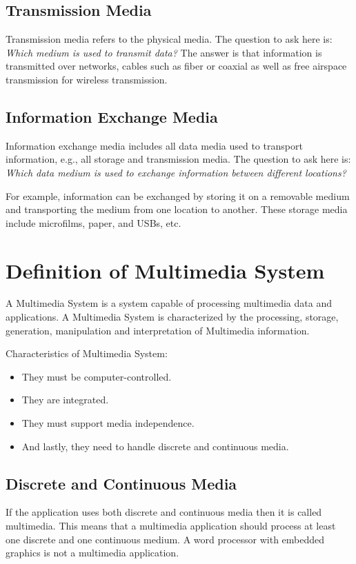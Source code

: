 \subsection{Transmission Media}
Transmission media refers to the physical media. The question to ask here is:
\emph{Which medium is used to transmit data?} The answer is that information is transmitted over networks, cables such as fiber or coaxial as well as free airspace transmission for wireless transmission.

\subsection{Information Exchange Media}
Information exchange media includes all data media used to transport information,
e.g., all storage and transmission media. The question to ask here is: \emph{Which data
medium is used to exchange information between different locations?}

For example, information can be exchanged by storing it on a removable medium
and transporting the medium from one location to another. These storage media include
microfilms, paper, and USBs, etc.

\section{Definition of Multimedia System}
A Multimedia System is a system capable of processing multimedia data and applications. A Multimedia System is characterized by the processing, storage, generation, manipulation and interpretation of Multimedia
information.


Characteristics of Multimedia System:

\begin{itemize}
	\item They must be computer-controlled.
	\item They are integrated.
	\item They must support media independence.
	\item And lastly, they need to handle discrete and continuous media.
\end{itemize}

\subsection{Discrete and Continuous Media}
If the application uses both discrete and continuous media then it is called multimedia. This means that a multimedia application should process at least one discrete and one continuous medium. A word processor with embedded graphics is not a multimedia application.

